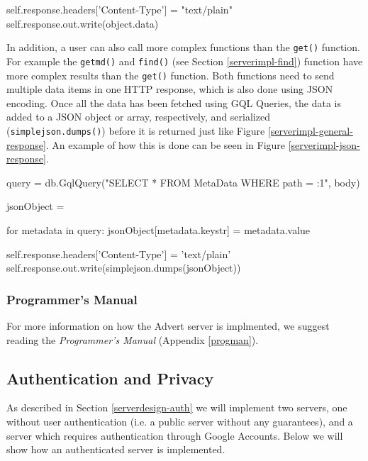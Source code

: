 \begin{figure*}[ht] %
\begin{center}
\begin{code}
self.response.headers['Content-Type'] = "text/plain"
self.response.out.write(object.data)
\end{code}
\caption{HTTP Response.\label{serverimpl-general-response}}
\end{center}
\end{figure*}

In addition, a user can also call more complex functions than the
\texttt{get()} function. For example the \texttt{getmd()} and \texttt{find()}
(see Section \ref{serverimpl-find}) function have more complex results than the
\texttt{get()} function. Both functions need to send multiple data items in one
HTTP response, which is also done using JSON encoding. Once all the data has been
fetched using GQL Queries, the data is added to a JSON object or array,
respectively, and serialized (\texttt{simplejson.dumps()}) before it is returned
just like Figure \ref{serverimpl-general-response}. An example of how this is
done can be seen in Figure \ref{serverimpl-json-response}.

\begin{figure*}[ht] %
\begin{center}
\begin{code}
query = db.GqlQuery("SELECT * FROM MetaData WHERE path = :1", body)

jsonObject = {}

for metadata in query:
  jsonObject[metadata.keystr] = metadata.value
  
self.response.headers['Content-Type'] = 'text/plain'
self.response.out.write(simplejson.dumps(jsonObject)) 
\end{code}
\caption{HTTP Response.\label{serverimpl-json-response}}
\end{center}
\end{figure*}

\subsubsection{Programmer's Manual}
For more information on how the Advert server is implmented, we suggest reading
the \emph{Programmer's Manual} (Appendix \ref{progman}).

\subsection{Authentication and Privacy}
As described in Section \ref{serverdesign-auth} we will implement two servers,
one without user authentication (i.e. a public server without any guarantees),
and a server which requires authentication through Google Accounts. Below we
will show how an authenticated server is implemented.

